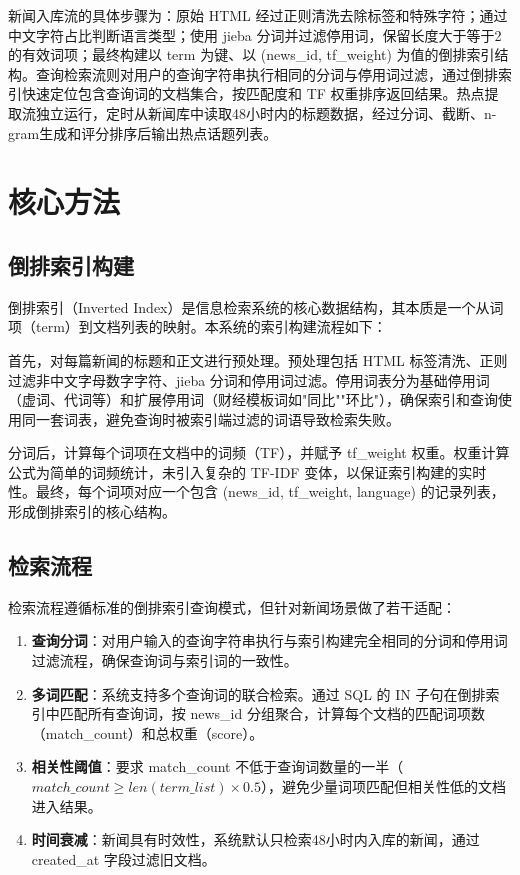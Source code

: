\documentclass[UTF8,a4paper,zihao=5]{ctexart}
\begin{document}
新闻入库流的具体步骤为：原始 HTML 经过正则清洗去除标签和特殊字符；通过中文字符占比判断语言类型；使用 jieba 分词并过滤停用词，保留长度大于等于2的有效词项；最终构建以 term 为键、以 (news\_id, tf\_weight) 为值的倒排索引结构。查询检索流则对用户的查询字符串执行相同的分词与停用词过滤，通过倒排索引快速定位包含查询词的文档集合，按匹配度和 TF 权重排序返回结果。热点提取流独立运行，定时从新闻库中读取48小时内的标题数据，经过分词、截断、n-gram生成和评分排序后输出热点话题列表。

\section{核心方法}

\subsection{倒排索引构建}

倒排索引（Inverted Index）是信息检索系统的核心数据结构，其本质是一个从词项（term）到文档列表的映射。本系统的索引构建流程如下：

首先，对每篇新闻的标题和正文进行预处理。预处理包括 HTML 标签清洗、正则过滤非中文字母数字字符、jieba 分词和停用词过滤。停用词表分为基础停用词（虚词、代词等）和扩展停用词（财经模板词如"同比""环比"），确保索引和查询使用同一套词表，避免查询时被索引端过滤的词语导致检索失败。

分词后，计算每个词项在文档中的词频（TF），并赋予 tf\_weight 权重。权重计算公式为简单的词频统计，未引入复杂的 TF-IDF 变体，以保证索引构建的实时性。最终，每个词项对应一个包含 (news\_id, tf\_weight, language) 的记录列表，形成倒排索引的核心结构。

\subsection{检索流程}

检索流程遵循标准的倒排索引查询模式，但针对新闻场景做了若干适配：

\begin{enumerate}
  \item \textbf{查询分词}：对用户输入的查询字符串执行与索引构建完全相同的分词和停用词过滤流程，确保查询词与索引词的一致性。
  \item \textbf{多词匹配}：系统支持多个查询词的联合检索。通过 SQL 的 IN 子句在倒排索引中匹配所有查询词，按 news\_id 分组聚合，计算每个文档的匹配词项数（match\_count）和总权重（score）。
  \item \textbf{相关性阈值}：要求 match\_count 不低于查询词数量的一半（$match\_count \geq len(term\_list) \times 0.5$），避免少量词项匹配但相关性低的文档进入结果。
  \item \textbf{时间衰减}：新闻具有时效性，系统默认只检索48小时内入库的新闻，通过 created\_at 字段过滤旧文档。
\end{enumerate}
\end{document}
